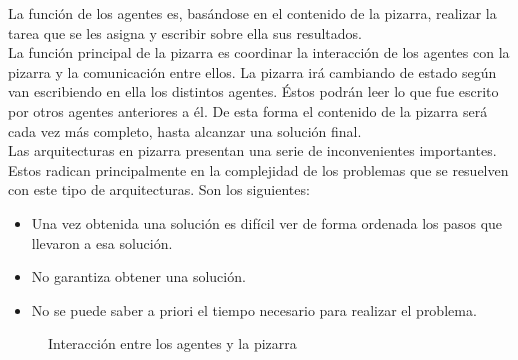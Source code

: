 La función de los agentes es, basándose en el contenido de la pizarra, realizar la tarea que se les asigna y escribir sobre ella sus resultados.\\

La función principal de la pizarra es coordinar la interacción de los agentes con la pizarra y la comunicación entre ellos. La pizarra irá cambiando de estado según van escribiendo en ella los distintos agentes. Éstos podrán leer lo que fue escrito por otros agentes anteriores a él. De esta forma el contenido de la pizarra será cada vez más completo, hasta alcanzar una solución final.\\

Las arquitecturas en pizarra presentan una serie de inconvenientes importantes. Estos radican principalmente en la complejidad de los problemas que se resuelven con este tipo de arquitecturas. Son los siguientes:

\begin{itemize}
	\item Una vez obtenida una solución es difícil ver de forma ordenada los pasos que llevaron a esa solución.
	\item No garantiza obtener una solución.
	\item No se puede saber a priori el tiempo necesario para realizar el problema.
\end{itemize}

\begin{figure}[!h]
\centering
\pizarra
\caption{Interacción entre los agentes y la pizarra}
\end{figure}